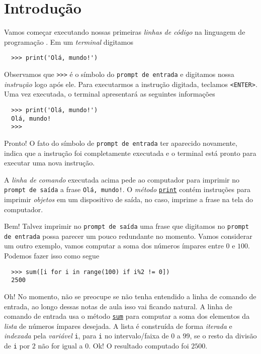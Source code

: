 
\chapter{Introdução}\label{cap_intro}
\thispagestyle{fancy}

Vamos começar executando nossas primeiras \emph{linhas de código} na linguagem de programação {\python}. Em um \emph{terminal} {\python} digitamos
\begin{lstlisting}
  >>> print('Olá, mundo!')
\end{lstlisting}
Observamos que \lstinline+>>>+ é o símbolo do \lstinline+prompt de entrada+ e digitamos nossa \emph{instrução} logo após ele. Para executarmos a instrução digitada, teclamos \lstinline+<ENTER>+. Uma vez executada, o terminal apresentará as seguintes informações
\begin{lstlisting}
  >>> print('Olá, mundo!')
  Olá, mundo!
  >>> 
\end{lstlisting}
Pronto! O fato do símbolo de \lstinline+prompt de entrada+ ter aparecido novamente, indica que a instrução foi completamente executada e o terminal está pronto para executar uma nova instrução.

A \emph{linha de comando} executada acima pede ao computador para imprimir no \lstinline+prompt de saída+ a frase \lstinline+Olá, mundo!+. O \emph{método} \href{https://docs.python.org/3/library/functions.html#print}{\lstinline+print+} contém instruções para imprimir \emph{objetos} em um dispositivo de saída, no caso, imprime a frase na tela do computador.

Bem! Talvez imprimir no \lstinline+prompt de saída+ uma frase que digitamos no \lstinline+prompt de entrada+ possa parecer um pouco redundante no momento. Vamos considerar um outro exemplo, vamos computar a soma dos números ímpares entre $0$ e $100$. Podemos fazer isso como segue
\begin{lstlisting}
  >>> sum([i for i in range(100) if i%2 != 0])
  2500
\end{lstlisting}
Oh! No momento, não se preocupe se não tenha entendido a linha de comando de entrada, ao longo dessas notas de aula isso vai ficando natural. A linha de comando de entrada usa o método \href{https://docs.python.org/3/library/functions.html#sum}{\lstinline+sum+} para computar a soma dos elementos da \emph{lista} de números ímpares desejada. A lista é construída de forma \emph{iterada} e \emph{indexada} pela \emph{variável} \lstinline+i+, para \lstinline+i+ no intervalo/faixa de $0$ a $99$, se o resto da divisão de \lstinline+i+ por $2$ não for igual a $0$. Ok! O resultado computado foi $2500$.

